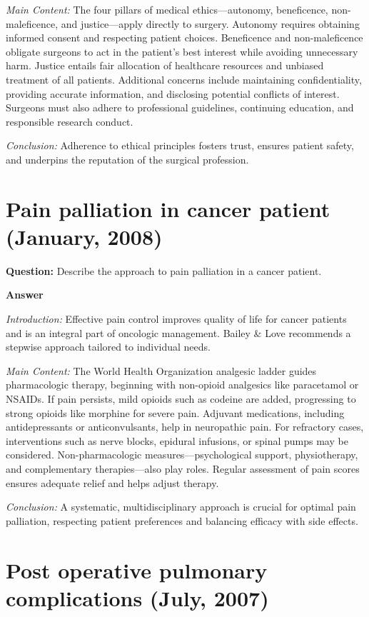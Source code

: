 \documentclass{article}
\begin{document}
\emph{Main Content:} The four pillars of medical ethics—autonomy, beneficence, non-maleficence, and justice—apply directly to surgery. Autonomy requires obtaining informed consent and respecting patient choices. Beneficence and non-maleficence obligate surgeons to act in the patient's best interest while avoiding unnecessary harm. Justice entails fair allocation of healthcare resources and unbiased treatment of all patients. Additional concerns include maintaining confidentiality, providing accurate information, and disclosing potential conflicts of interest. Surgeons must also adhere to professional guidelines, continuing education, and responsible research conduct.

\emph{Conclusion:} Adherence to ethical principles fosters trust, ensures patient safety, and underpins the reputation of the surgical profession.


\section{Pain palliation in cancer patient (January, 2008)}


\textbf{Question:} Describe the approach to pain palliation in a cancer patient.

\textbf{Answer}

\emph{Introduction:} Effective pain control improves quality of life for cancer patients and is an integral part of oncologic management. Bailey \& Love recommends a stepwise approach tailored to individual needs.

\emph{Main Content:} The World Health Organization analgesic ladder guides pharmacologic therapy, beginning with non-opioid analgesics like paracetamol or NSAIDs. If pain persists, mild opioids such as codeine are added, progressing to strong opioids like morphine for severe pain. Adjuvant medications, including antidepressants or anticonvulsants, help in neuropathic pain. For refractory cases, interventions such as nerve blocks, epidural infusions, or spinal pumps may be considered. Non-pharmacologic measures—psychological support, physiotherapy, and complementary therapies—also play roles. Regular assessment of pain scores ensures adequate relief and helps adjust therapy.

\emph{Conclusion:} A systematic, multidisciplinary approach is crucial for optimal pain palliation, respecting patient preferences and balancing efficacy with side effects.


\section{Post operative pulmonary complications (July, 2007)}
\end{document}
